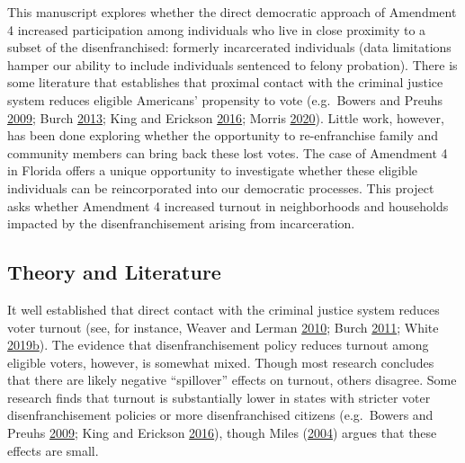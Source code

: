 \documentclass[
  12pt,
]{article}
\begin{document}
This manuscript explores whether the direct democratic approach of Amendment 4 increased participation among individuals who live in close proximity to a subset of the disenfranchised: formerly incarcerated individuals (data limitations hamper our ability to include individuals sentenced to felony probation). There is some literature that establishes that proximal contact with the criminal justice system reduces eligible Americans' propensity to vote (e.g.~Bowers and Preuhs \protect\hyperlink{ref-Bowers2009}{2009}; Burch \protect\hyperlink{ref-Burch2013}{2013}; King and Erickson \protect\hyperlink{ref-King2016}{2016}; Morris \protect\hyperlink{ref-Morris2020}{2020}). Little work, however, has been done exploring whether the opportunity to re-enfranchise family and community members can bring back these lost votes. The case of Amendment 4 in Florida offers a unique opportunity to investigate whether these eligible individuals can be reincorporated into our democratic processes. This project asks whether Amendment 4 increased turnout in neighborhoods and households impacted by the disenfranchisement arising from incarceration.

\hypertarget{theory-and-literature}{%
\subsection*{Theory and Literature}\label{theory-and-literature}}

It well established that direct contact with the criminal justice system reduces voter turnout (see, for instance, Weaver and Lerman \protect\hyperlink{ref-Weaver2010}{2010}; Burch \protect\hyperlink{ref-Burch2011}{2011}; White \protect\hyperlink{ref-White2019}{2019}\protect\hyperlink{ref-White2019}{b}). The evidence that disenfranchisement policy reduces turnout among eligible voters, however, is somewhat mixed. Though most research concludes that there are likely negative ``spillover'' effects on turnout, others disagree. Some research finds that turnout is substantially lower in states with stricter voter disenfranchisement policies or more disenfranchised citizens (e.g.~Bowers and Preuhs \protect\hyperlink{ref-Bowers2009}{2009}; King and Erickson \protect\hyperlink{ref-King2016}{2016}), though Miles (\protect\hyperlink{ref-Miles2004}{2004}) argues that these effects are small.
\end{document}
